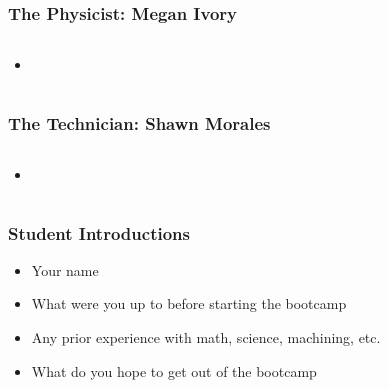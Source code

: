 \documentclass{beamer}
\begin{document}
\begin{frame}
\frametitle{The Physicist: Megan Ivory}
\begin{columns}
\begin{column}{7cm}
\begin{itemize}
\item 
\end{itemize}
\vspace{1cm} 
\end{column}
\begin{column}{4cm}
\begin{center}

\end{center}
\end{column}
\end{columns}
\end{frame}

\begin{frame}
\frametitle{The Technician: Shawn Morales}
\begin{columns}
\begin{column}{7cm}
\begin{itemize}
\item 

\vspace{0.25cm}

\end{itemize}
\vspace{1cm} 
\end{column}
\begin{column}{4cm}
\begin{center}

\end{center}
\end{column}
\end{columns}
\end{frame}








\begin{frame}\frametitle{Student Introductions}
\begin{itemize}
\item Your name
\item What were you up to before starting the bootcamp
\item Any prior experience with math, science, machining, etc.
\item What do you hope to get out of the bootcamp
\end{itemize}
\end{frame}
\end{document}
